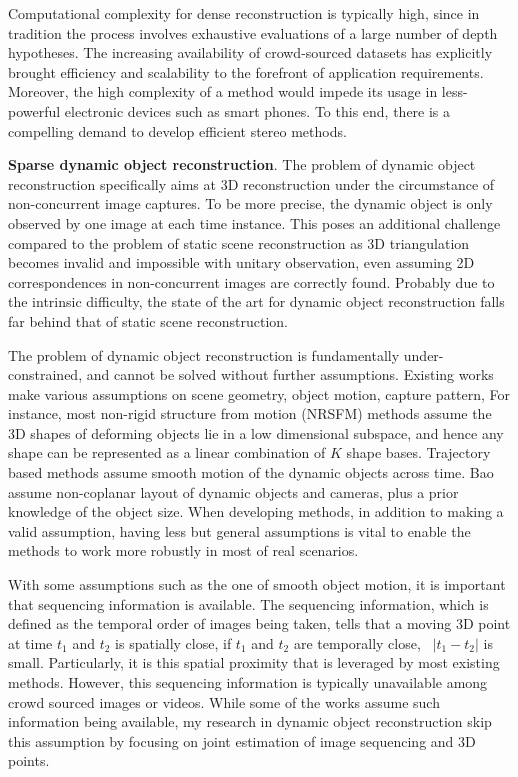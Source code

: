 Computational complexity for dense reconstruction is typically high, since in tradition the process involves exhaustive evaluations of a large number of depth hypotheses. The increasing availability of crowd-sourced datasets has explicitly brought efficiency and scalability to the forefront of application requirements.  Moreover, the high complexity of a method would impede its usage in less-powerful electronic devices such as smart phones. To this end, there is a compelling demand to develop efficient stereo methods.

\textbf{Sparse dynamic object reconstruction}.
The problem of dynamic object reconstruction specifically aims at 3D reconstruction under the circumstance of non-concurrent image captures. To be more precise, the dynamic object is only observed by one image at each time instance. This poses an additional challenge compared to the problem of static  scene reconstruction as 3D triangulation becomes invalid and impossible with unitary observation, even assuming 2D correspondences in non-concurrent images are correctly found. Probably due to the intrinsic difficulty, the state of the art for dynamic object reconstruction falls far behind that of static scene reconstruction.

The problem of dynamic object reconstruction is fundamentally under-constrained, and cannot be solved without further assumptions. 
Existing works make various assumptions on scene geometry, object motion, capture pattern, \etc
For instance, most non-rigid structure from motion (NRSFM) methods assume the 3D shapes of deforming objects lie in a low dimensional subspace, and hence any shape can be represented as a linear combination of $K$ shape bases. Trajectory based methods assume smooth motion of the dynamic objects across time. Bao \etal~ assume non-coplanar layout of dynamic objects and cameras, plus a prior knowledge of the object size. When developing methods, in addition to making a valid assumption, having less but general assumptions is vital to enable the methods to work more robustly in most of real scenarios. 

With some assumptions such as the one of smooth object motion, it is important that sequencing information is available. The sequencing information, which is defined as the temporal order of images being taken, tells that a moving 3D point at time $t_1$ and $t_2$ is spatially close, if $t_1$ and $t_2$ are temporally close, \ie~$|t_1-t_2|$ is small. Particularly, it is this spatial proximity that is leveraged by most existing methods. However, this sequencing information is typically unavailable among crowd sourced images or videos. While some of the works assume such information being available, my research in dynamic object reconstruction skip this assumption by focusing on joint estimation of image sequencing and 3D points.



